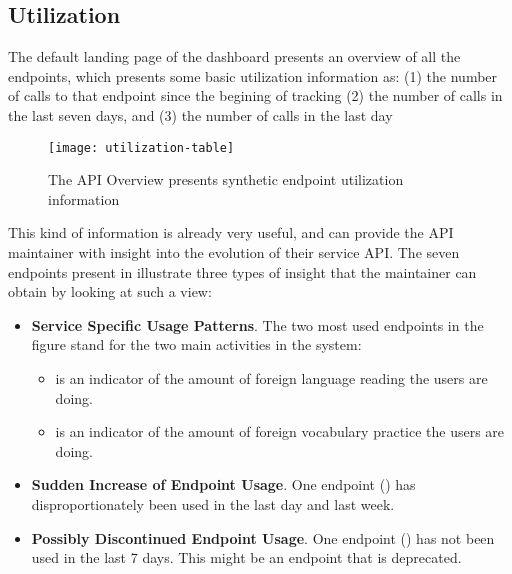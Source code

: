 
\subsection{Utilization}
\label{sec:util}
 
  The default landing page of the dashboard presents an overview of all the endpoints, 
  which presents some basic utilization information as:
  (1) the number of calls to that endpoint since the begining of tracking
  (2) the number of calls in the last seven days, and
  (3) the number of calls in the last day


    \begin{figure}[h!]
      \centering
      \texttt{[image: utilization-table]}
      \caption{The API Overview presents synthetic endpoint utilization information}
      \label{fig:basicest}
    \end{figure}

  This kind of information is already very useful, and can provide the API maintainer with insight into the evolution of their service API. The seven endpoints present in  illustrate three types of insight that the maintainer can obtain by looking at such a view: 

  \begin{itemize}

    \item {\bf Service Specific Usage Patterns}. The two most used endpoints in the figure stand for the two main activities in the system: 

      \begin{itemize}

        \item \epTranslationsColor is an indicator of the amount of foreign language reading the users are doing. 

        \item \epOutcomeColor is an indicator of the amount of foreign vocabulary practice the users are doing.

      \end{itemize}

    \item {\bf Sudden Increase of Endpoint Usage}. One endpoint (\epUserActivityColor) has disproportionately been used in the last day and last week. 

    \item {\bf Possibly Discontinued Endpoint Usage}. One endpoint (\epFeedItemsColor) has not been used in the last 7 days. This might be an endpoint that is deprecated.

  \end{itemize}


